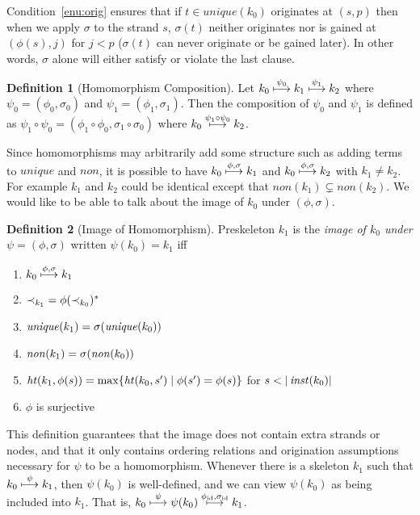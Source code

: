 \documentclass[12pt]{article}
\theoremstyle{definition}
\newtheorem{defn}{Definition}[section]
\begin{document}
Condition~\ref{enu:orig} ensures that if $t\in unique(k_0)$ originates
at $(s,p)$ then when we apply $\sigma$ to the strand $s$, $\sigma(t)$
neither originates nor is gained at $(\phi(s),j)$ for $j<p$
($\sigma(t)$ can never originate or be gained later).  In other words,
$\sigma$ alone will either satisfy or violate the last clause.

\begin{defn}[Homomorphism Composition]\label{def:composition}
Let $k_0\stackrel{\psi_0}{\longmapsto}k_1\stackrel{\psi_1}{\longmapsto}k_2$ where
$\psi_0 = (\phi_0,\sigma_0)$ and $\psi_1=(\phi_1,\sigma_1).$  Then the
composition  of $\psi_0$ and $\psi_1$ is defined as
$\psi_1\circ\psi_0 = (\phi_1\circ\phi_0,\sigma_1\circ\sigma_0)$
where $k_0\stackrel{\psi_1\circ\psi_0}{\longmapsto}k_2$.
\end{defn}

Since homomorphisms may arbitrarily add some structure such as adding terms
to $unique$ and $non$, it is possible to have
$k_0\stackrel{\phi,\sigma}{\longmapsto}k_1$ and $k_0\stackrel{\phi,\sigma}{\longmapsto}k_2$
with $k_1\ne k_2$.
For example $k_1$ and $k_2$ could be identical except that $non(k_1)\subsetneq
non(k_2)$.  We would like to be able to talk about the image of $k_0$
under $(\phi,\sigma)$.

\begin{defn}[Image of Homomorphism]\label{def:image}
Preskeleton $k_1$ is the \emph{image of $k_0$ under $\psi=(\phi,\sigma)$}
written $\psi(k_0)=k_1$ iff
\begin{enumerate}
\item $k_0\stackrel{\phi,\sigma}{\longmapsto}k_1$
\item $\mathbin{\prec_{k_1}}=\phi(\mathbin{\prec_{k_0}})^*$
\item $\operatorname{\mathit{unique}}(k_1)=\sigma(\operatorname{\mathit{unique}}(k_0))$
\item $\operatorname{\mathit{non}}(k_1)=\sigma(\operatorname{\mathit{non}}(k_0))$
\item $\operatorname{\mathit{ht}}(k_1,\phi(s))=\max \{\operatorname{\mathit{ht}}(k_0, s')\mid \phi(s')=\phi(s)\}$
 for $s<|\fn{inst}(k_0)|$
\item $\phi$ is surjective
\end{enumerate}
\end{defn}

This definition guarantees that the image does not contain extra strands or
nodes, and that it only contains ordering relations and origination assumptions
necessary for $\psi$ to be a homomorphism.  Whenever there is a skeleton $k_1$
such that $k_0\stackrel{\psi}{\longmapsto}k_1$, then $\psi(k_0)$ is well-defined, and
we can view $\psi(k_0)$ as being included into $k_1$.  That is,
$k_0\stackrel{\psi}{\longmapsto}\psi(k_0)\stackrel{\phi_{\mathrm{id}},\sigma_{\mathrm{id}}}{\longmapsto}k_1$.
\end{document}
